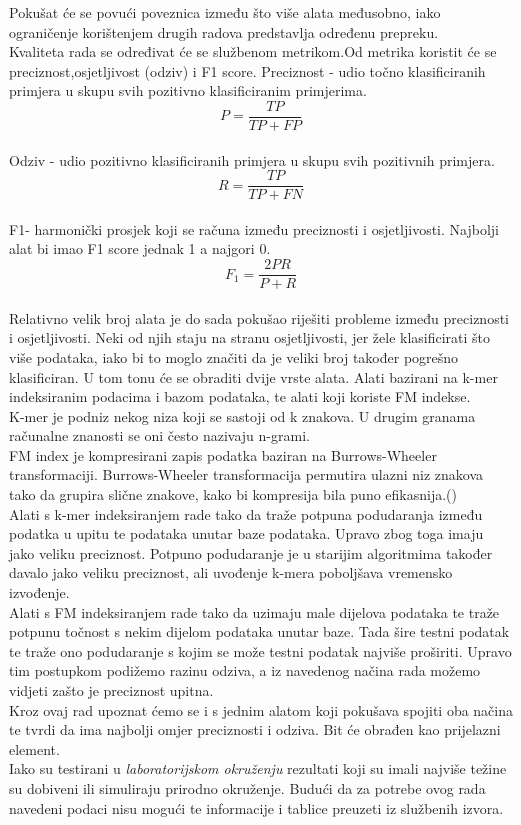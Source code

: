 \documentclass[times, utf8, seminar]{fer}
\begin{document}
Pokušat će se povući poveznica između što više alata međusobno, iako ograničenje korištenjem drugih radova predstavlja određenu prepreku.
\\Kvaliteta rada se određivat će se službenom metrikom.Od metrika koristit će se preciznost,osjetljivost (odziv) i F1 score. Preciznost - udio točno klasificiranih primjera u skupu svih pozitivno klasificiranim primjerima.$$P=\dfrac{TP}{TP+FP}$$
\\ Odziv - udio pozitivno klasificiranih primjera u skupu svih pozitivnih primjera. $$R=\dfrac{TP}{TP+FN}$$ 
\\F1- harmonički prosjek koji se računa između preciznosti i osjetljivosti. Najbolji alat bi imao F1 score jednak 1 a najgori 0.
$$F_{1}=\dfrac{2PR}{P+R}$$
\\Relativno velik broj alata je do sada pokušao riješiti probleme između preciznosti i osjetljivosti. Neki od njih staju na stranu osjetljivosti, jer žele klasificirati što više podataka, iako bi to moglo značiti da je veliki broj također pogrešno klasificiran. U tom tonu će se obraditi dvije vrste alata. Alati bazirani na k-mer indeksiranim podacima i bazom podataka, te alati koji koriste FM indekse.
\\K-mer je podniz nekog niza koji se sastoji od k znakova. U drugim granama računalne znanosti se oni često nazivaju n-grami.
\\FM index je kompresirani zapis podatka baziran na Burrows-Wheeler transformaciji. Burrows-Wheeler transformacija permutira ulazni niz znakova tako da grupira slične znakove, kako bi kompresija bila puno efikasnija.(\cite{FM})
\\Alati s k-mer indeksiranjem rade tako da traže potpuna podudaranja između podatka u upitu te podataka unutar baze podataka. Upravo zbog toga imaju jako veliku preciznost. Potpuno podudaranje je u starijim algoritmima također davalo jako veliku preciznost, ali uvođenje k-mera poboljšava vremensko izvođenje.
\\Alati s FM indeksiranjem rade tako da uzimaju male dijelova podataka te traže potpunu točnost s nekim dijelom podataka unutar baze. Tada šire testni podatak te traže ono podudaranje s kojim se može testni podatak najviše proširiti. Upravo tim postupkom podižemo razinu odziva, a iz navedenog načina rada možemo vidjeti zašto je preciznost upitna.
\\Kroz ovaj rad upoznat ćemo se i s jednim alatom koji pokušava spojiti oba načina te tvrdi da ima najbolji omjer preciznosti i odziva. Bit će obrađen kao prijelazni element.
\\Iako su testirani u \textit{laboratorijskom okruženju} rezultati koji su imali najviše težine su dobiveni ili simuliraju prirodno okruženje. Budući da za potrebe ovog rada navedeni podaci nisu mogući te informacije i tablice preuzeti iz službenih izvora.
\end{document}
